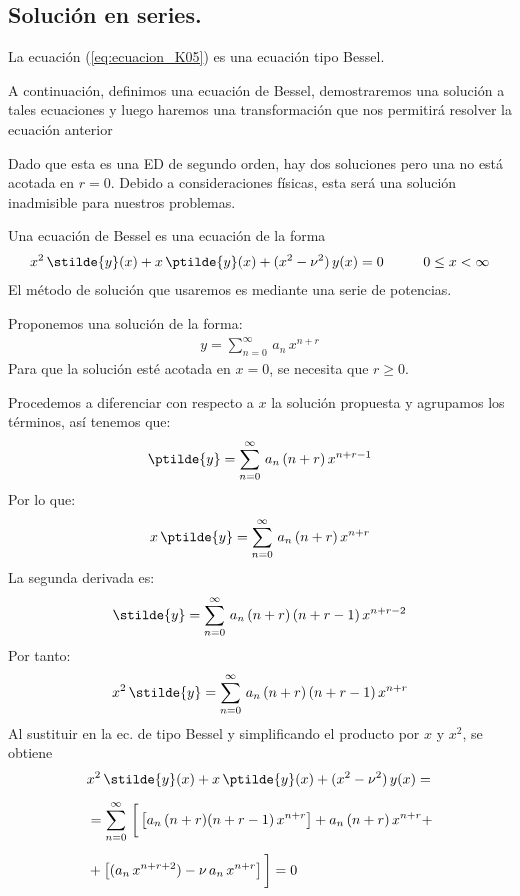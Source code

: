 \subsection{Solución en series.}

La ecuación (\ref{eq:ecuacion_K05}) es una ecuación tipo Bessel.
\par
A continuación, definimos una ecuación de Bessel, demostraremos una solución a tales ecuaciones y luego haremos una transformación que nos permitirá resolver la ecuación anterior
\par
Dado que esta es una ED de segundo orden, hay dos soluciones pero una no está acotada en $r = 0$. Debido a consideraciones físicas, esta será una solución inadmisible para nuestros problemas.
\par
Una ecuación de Bessel es una ecuación de la forma
\begin{align*}
x^{2} \, \stilde{y} (x) + x \,\ptilde{y} (x) + (x^{2} - \nu^{2}) \, y(x) = 0 \hspace{1cm} 0 \leq x < \infty
\end{align*}
El método de solución que usaremos es mediante una serie de potencias.
\par
Proponemos una solución de la forma:
\begin{align*}
y = \sum_{n=0}^{\infty} \, a_{n} \, x^{n+r}
\end{align*}
Para que la solución esté acotada en $x = 0$, se necesita que $r \geq 0$.
\par
Procedemos a diferenciar con respecto a $x$ la solución propuesta y agrupamos los términos, así tenemos que:
\begin{align*}
\ptilde{y} = \sum_{n=0}^{\infty} \, a_{n} \, (n + r) \, x^{n+r-1}
\end{align*}
Por lo que:
\begin{align*}
x \, \ptilde{y} = \sum_{n=0}^{\infty} \, a_{n} \, (n + r) \, x^{n+r}
\end{align*}
La segunda derivada es:
\begin{align*}
\stilde{y} = \sum_{n=0}^{\infty} \, a_{n} \, (n + r) \, (n + r - 1) \, x^{n+r-2}
\end{align*}
Por tanto:
\begin{align*}
x^{2} \, \stilde{y} = \sum_{n=0}^{\infty} \, a_{n} \, (n + r) \, (n + r - 1) \, x^{n+r}
\end{align*}
Al sustituir en la ec. de tipo Bessel y simplificando el producto por $x$ y $x^{2}$, se obtiene
\begin{align*}
&x^{2} \, \stilde{y} (x) + x \,\ptilde{y} (x) + (x^{2} - \nu^{2}) \, y(x) = \\[0.5em]
&= \sum_{n=0}^{\infty} \, \bigg[ \left[ a_{n} \, (n + r) (n + r -1) \, x^{n+r} \right] + a_{n} \, (n + r) \, x^{n+r} + \\[0.5em]
&+ \left[ (a_{n} \, x^{n+r+2} ) - \nu \, a_{n} \, x^{n+r} \right] \bigg] = 0
\end{align*}
